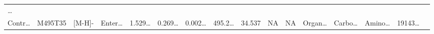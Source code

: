 \documentclass[
]{article}
\begin{document}
\begin{longtable}[]{@{}llllllllllllllll@{}}
\begin{minipage}[t]{0.02\columnwidth}
\ldots{}\strut
\end{minipage}\tabularnewline
\begin{minipage}[t]{0.04\columnwidth}\raggedright
Contr\ldots{}\strut
\end{minipage} & \begin{minipage}[t]{0.04\columnwidth}\raggedright
M495T35\strut
\end{minipage} & \begin{minipage}[t]{0.04\columnwidth}\raggedright
{[}M-H{]}-\strut
\end{minipage} & \begin{minipage}[t]{0.04\columnwidth}\raggedright
Enter\ldots{}\strut
\end{minipage} & \begin{minipage}[t]{0.04\columnwidth}\raggedright
1.529\ldots{}\strut
\end{minipage} & \begin{minipage}[t]{0.04\columnwidth}\raggedright
0.269\ldots{}\strut
\end{minipage} & \begin{minipage}[t]{0.04\columnwidth}\raggedright
0.002\ldots{}\strut
\end{minipage} & \begin{minipage}[t]{0.04\columnwidth}\raggedright
495.2\ldots{}\strut
\end{minipage} & \begin{minipage}[t]{0.04\columnwidth}\raggedright
34.537\strut
\end{minipage} & \begin{minipage}[t]{0.04\columnwidth}\raggedright
NA\strut
\end{minipage} & \begin{minipage}[t]{0.03\columnwidth}\raggedright
NA\strut
\end{minipage} & \begin{minipage}[t]{0.04\columnwidth}\raggedright
Organ\ldots{}\strut
\end{minipage} & \begin{minipage}[t]{0.04\columnwidth}\raggedright
Carbo\ldots{}\strut
\end{minipage} & \begin{minipage}[t]{0.04\columnwidth}\raggedright
Amino\ldots{}\strut
\end{minipage} & \begin{minipage}[t]{0.04\columnwidth}\raggedright
19143\ldots{}\strut
\end{minipage} & \begin{minipage}[t]{0.02\columnwidth}\raggedright

\end{minipage}
\end{longtable}
\end{document}
